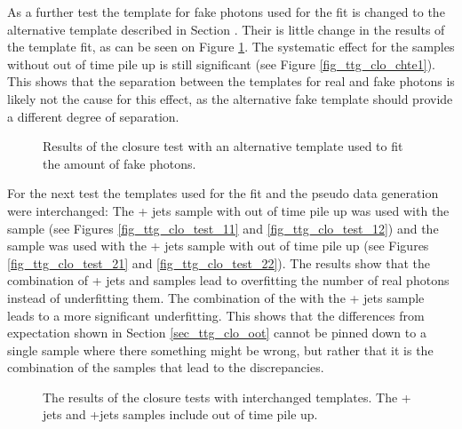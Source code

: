 As a further test the template for fake photons used for the fit is changed to the alternative template described in Section . Their is little change in the results of the template fit, as can be seen on Figure \ref{fig_ttg_clo_chte}. The systematic effect for the samples without out of time pile up is still significant (see Figure \ref{fig_ttg_clo_chte1}). This shows that the separation between the templates for real and fake photons is likely not the cause for this effect, as the alternative fake template should provide a different degree of separation.\\

\begin{figure}[ht]
  \caption{Results of the closure test with an alternative template used to fit the amount of fake photons.}
  \label{fig_ttg_clo_chte}
\end{figure}

For the next test the templates used for the fit and the pseudo data generation were interchanged: The \ttgamma + jets sample with out of time pile up was used with the \ttbar sample (see Figures \ref{fig_ttg_clo_test_11} and \ref{fig_ttg_clo_test_12}) and the \ttgamma sample was used with the \ttbar + jets sample with out of time pile up (see Figures \ref{fig_ttg_clo_test_21} and \ref{fig_ttg_clo_test_22}). The results show that the combination of \ttgamma + jets and \ttbar samples lead to overfitting the number of real photons instead of underfitting them. The combination of the \ttgamma with the \ttbar + jets sample leads to a more significant underfitting. This shows that the differences from expectation shown in Section \ref{sec_ttg_clo_oot} cannot be pinned down to a single sample where there something might be wrong, but rather that it is the combination of the samples that lead to the discrepancies.

\begin{figure}[ht]
  \caption{The results of the closure tests with interchanged templates. The \ttgamma + jets and \ttbar +jets samples include out of time pile up.}
  \label{fig_ttg_clo_test}
\end{figure}


